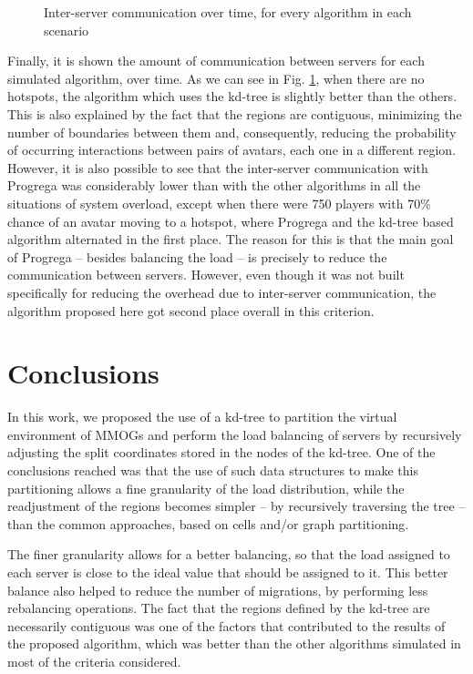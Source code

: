 \documentclass[acmjacm]{acmtrans2m}
\newcommand{\figurecaption}{Fig.}
\begin{document}
\begin{figure}[!t]
	\caption{Inter-server communication over time, for every algorithm in each scenario}
	\label{fig:overhead}
\end{figure}

Finally, it is shown the amount of communication between servers for each simulated algorithm, over time. As we can see in \figurecaption{} \ref{fig:overhead}, when there are no hotspots, the algorithm which uses the kd-tree is slightly better than the others. This is also explained by the fact that the regions are contiguous, minimizing the number of boundaries between them and, consequently, reducing the probability of occurring interactions between pairs of avatars, each one in a different region. However, it is also possible to see that the inter-server communication with Progrega was considerably lower than with the other algorithms in all the situations of system overload, except when there were 750 players with 70\% chance of an avatar moving to a hotspot, where Progrega and the kd-tree based algorithm alternated in the first place. The reason for this is that the main goal of Progrega -- besides balancing the load -- is precisely to reduce the communication between servers. However, even though it was not built specifically for reducing the overhead due to inter-server communication, the algorithm proposed here got second place overall in this criterion.

\section{Conclusions}
\label{sec:conc}

In this work, we proposed the use of a kd-tree to partition the virtual environment of MMOGs and perform the load balancing of servers by recursively adjusting the split coordinates stored in the nodes of the kd-tree. One of the conclusions reached was that the use of such data structures to make this partitioning allows a fine granularity of the load distribution, while the readjustment of the regions becomes simpler -- by recursively traversing the tree -- than the common approaches, based on cells and/or graph partitioning.

The finer granularity allows for a better balancing, so that the load assigned to each server is close to the ideal value that should be assigned to it. This better balance also helped to reduce the number of migrations, by performing less rebalancing operations. The fact that the regions defined by the kd-tree are necessarily contiguous was one of the factors that contributed to the results of the proposed algorithm, which was better than the other algorithms simulated in most of the criteria considered.
\end{document}
